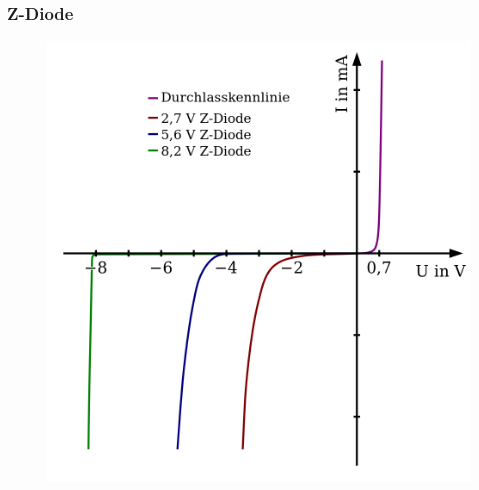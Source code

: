\begin{frame}
  \frametitle{Z-Diode}
  \begin{center}
    \begin{figure}
      \includegraphics[width=.7\textwidth,height=.75\textheight,keepaspectratio]{a05/Kennlinie_Z-Diode.png}
    \end{figure}
  \end{center}
\end{frame}

